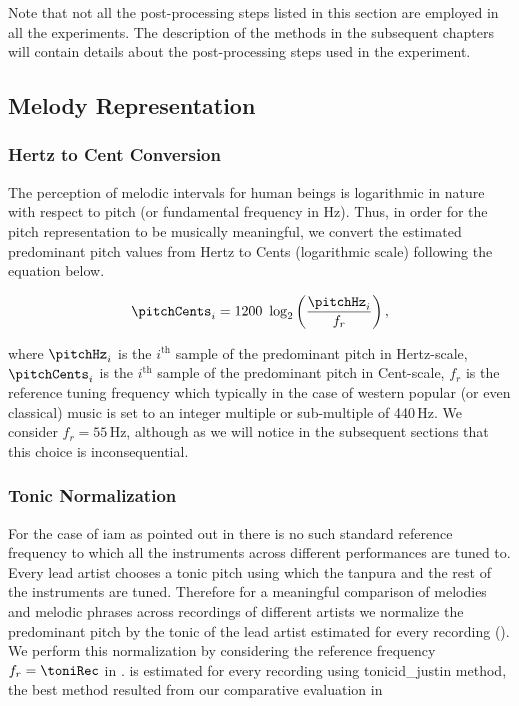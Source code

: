 {Note that not all the post-processing steps listed in this section are employed in all the experiments. The description of the methods in the subsequent chapters will contain details about the post-processing steps used in the experiment.


\subsection{Melody Representation} 
\label{sec:pre_processing_melody_representation}


\subsubsection{Hertz to Cent Conversion}
\label{sec:data_processing_cent_conversion}

The perception of melodic intervals for human beings is logarithmic in nature with respect to pitch (or fundamental frequency in Hz). Thus, in order for the pitch representation to be musically meaningful,  we convert the estimated predominant pitch values from Hertz to Cents (logarithmic scale) following the equation below.

\begin{equation}
\label{eq:hertz_to_cent_conversion}	
\pitchCents_i = 1200~\log_2\left(\frac{\pitchHz_i}{f_r}\right) ,
\end{equation}

\noindent where $\pitchHz_i$ is the $i^\mathrm{th}$ sample of the predominant pitch in Hertz-scale, $\pitchCents_i$ is the $i^\mathrm{th}$ sample of the predominant pitch in Cent-scale, $f_r$ is the reference tuning frequency which typically in the case of western popular (or even classical) music is set to an integer multiple or sub-multiple of 440\,Hz. We consider $f_r=55$\,Hz, although as we will notice in the subsequent sections that this choice is inconsequential.
  

\subsubsection{Tonic Normalization}
\label{sec:tonic_normalization}

For the case of \gls{iam} as pointed out in  there is no such standard reference frequency to which all the instruments across different performances are tuned to. Every lead artist chooses a tonic pitch using which the \gls{tanpura} and the rest of the instruments are tuned. Therefore for a meaningful comparison of melodies and melodic phrases across recordings of different artists we normalize the predominant pitch by the tonic of the lead artist estimated for every recording (\toniRec). We perform this normalization by considering the reference frequency $f_r=\toniRec$ in . \toniRec is estimated for every recording using \acrshort{tonicid_justin} method, the best method resulted from our comparative evaluation in~



}
